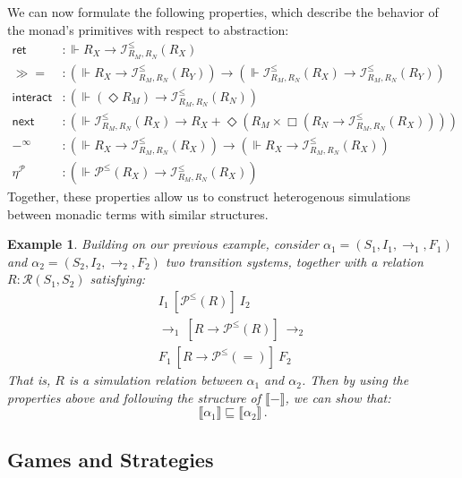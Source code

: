 \documentclass{article}
\newtheorem{example}{Example}
\newcommand{\kw}[1]{\ensuremath{ \mathsf{#1} }}
\newcommand{\ifr}[1]{\ [{#1}]\ }
\newcommand{\bind}{\gg\!\!=}
\begin{document}
We can now formulate the following properties,
which describe the behavior of the monad's primitives
with respect to abstraction:
\begin{align*}
  \kw{ret} &:
    {}\Vdash R_X \rightarrow \mathcal{I}^\le_{R_M,R_N}(R_X) \\
  \bind &:
    (\Vdash R_X \rightarrow
     \mathcal{I}^\le_{R_M,R_N}(R_Y)) \rightarrow
    (\Vdash \mathcal{I}^\le_{R_M,R_N}(R_X) \rightarrow
     \mathcal{I}^\le_{R_M,R_N}(R_Y)) \\
  \kw{interact} &:
    (\Vdash (\Diamond R_M) \rightarrow
     \mathcal{I}^\le_{R_M,R_N}(R_N)) \\
  \kw{next} &:
    (\Vdash \mathcal{I}^\le_{R_M,R_N}(R_X) \rightarrow
     R_X +
     \Diamond (R_M \times
     \Box (R_N \rightarrow \mathcal{I}^\le_{R_M,R_N}(R_X)))) \\
  -^\infty &:
    (\Vdash R_X \rightarrow \mathcal{I}^\le_{R_M,R_N}(R_X)) \rightarrow
    (\Vdash R_X \rightarrow \mathcal{I}^\le_{R_M,R_N}(R_X)) \\
  \eta^\mathcal{P} &:
    (\Vdash \mathcal{P}^\le(R_X) \rightarrow
     \mathcal{I}^\le_{R_M,R_N}(R_X))
\end{align*}
Together,
these properties allow us to construct
heterogenous simulations
between monadic terms with similar structures.

\begin{example} \label{ex:sim}
Building on our previous example,
consider
$\alpha_1 = (S_1, I_1, {\rightarrow}_1, F_1)$ and
$\alpha_2 = (S_2, I_2, {\rightarrow}_2, F_2)$
two transition systems,
together with a relation
$R : \mathcal{R}(S_1, S_2)$
satisfying:
\begin{gather*}
  I_1 \ifr{\mathcal{P}^\le(R)} I_2 \\
  {\rightarrow}_1 \ifr{R \rightarrow \mathcal{P}^\le(R)} {\rightarrow}_2 \\
  F_1 \ifr{R \rightarrow \mathcal{P}^\le(=)} F_2
\end{gather*}
That is, $R$ is a simulation relation between $\alpha_1$ and $\alpha_2$.
Then by using the properties above and
following the structure of $\llbracket - \rrbracket$,
we can show that:
\[
    \llbracket \alpha_1 \rrbracket \sqsubseteq
    \llbracket \alpha_2 \rrbracket \,.
\]
\end{example}


\subsection{Games and Strategies} \label{sec:monad:games} %
\end{document}
